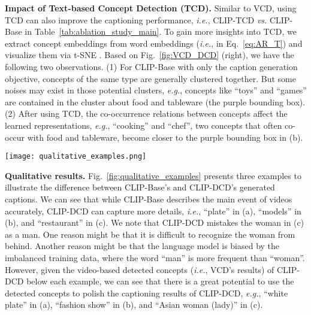\documentclass[runningheads]{llncs}
\newcommand\vs{\textit{vs.}}
\newcommand\eg{\textit{e.g.}}
\newcommand\ie{\textit{i.e.}}
\begin{document}
\noindent\textbf{Impact of Text-based Concept Detection (TCD).} 
Similar to VCD, using TCD can also improve the captioning performance, \ie{}, CLIP-TCD \vs{} CLIP-Base in Table~\ref{tab:ablation_study_main}. To gain more insights into TCD, we extract  concept embeddings from word embeddings (\ie{},  in Eq.~\ref{eq:AR_T}) and visualize them via t-SNE \cite{van2008visualizing}. Based on Fig.~\ref{fig:VCD_DCD} (right), we have the following two observations. 
(1) For CLIP-Base with only the caption generation objective, concepts of the same type are generally clustered together. But some noises may exist in those potential clusters, \eg{}, concepts like ``toys'' and ``games'' are contained in the cluster about food and tableware (the purple bounding box). 
(2) After using TCD, the co-occurrence relations between concepts affect the learned representations, \eg{}, ``cooking'' and ``chef'', two concepts that often co-occur with food and tableware, become closer to the purple bounding box in (b).



\begin{figure*}[t]
\centering
\texttt{[image: qualitative\_examples.png]}
\caption{Captioning results of the CLIP-Base (M1) and CLIP-DCD (M2) models, where we emphasize \textcolor{darkgreen}{\textbf{accurate keywords}} and \textcolor{red}{\textbf{\underline{errors}}}. Among M2's video-based detected concepts, we highlight \textcolor{orange}{\textbf{\textit{meaningful concepts}}} yet to be utilized.
} 
\label{fig:qualitative_examples}
\end{figure*}

\noindent\textbf{Qualitative results.} Fig.~\ref{fig:qualitative_examples} presents three examples to illustrate the difference between CLIP-Base's and CLIP-DCD's generated captions. We can see that while CLIP-Base describes the main event of videos accurately, CLIP-DCD can capture more details, \ie{}, ``plate'' in (a), ``models'' in (b), and ``restaurant'' in (c). We note that CLIP-DCD mistakes the woman in (c) as a man. One reason might be that it is difficult to recognize the woman from behind. Another reason might be that the language model is biased by the imbalanced training data, where the word ``man'' is more frequent than ``woman''. However, given the video-based detected concepts (\ie{}, VCD's results) of CLIP-DCD below each example, we can see that there is a great potential to use the detected concepts to polish the captioning results of CLIP-DCD, \eg{}, ``white plate'' in (a), ``fashion show'' in (b), and ``Asian woman (lady)'' in (c). 
\end{document}
